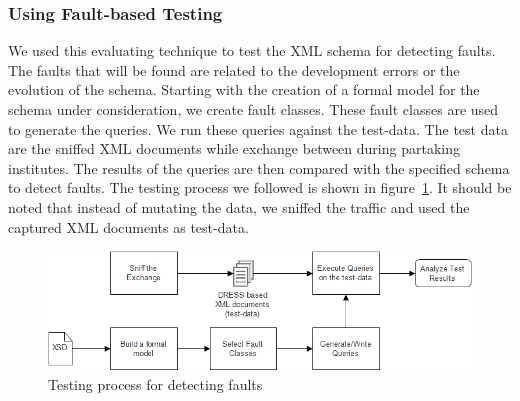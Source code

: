 \documentclass[12pt,a4paper,oneside]{book}
\begin{document}
		\subsubsection{Using Fault-based Testing}
		We used this evaluating technique to test the XML schema for detecting faults. The faults that will be found are related to the development errors or the evolution of the schema\cite{Testing XML Schemas}. Starting with the creation of a formal model for the schema under consideration, we create fault classes. These fault classes are used to generate the queries. We run these queries against the test-data. The test data are the sniffed XML documents while exchange between during partaking institutes. The results of the queries are then compared with the specified schema to detect faults. The testing process we followed is shown in figure~\ref{fig:fault-based-testing}. It should be noted that instead of mutating the data, we sniffed the traffic and used the captured XML documents as test-data.  		
		
\begin{figure}[!htp]
  \centering
  \includegraphics[width=13.5cm]{fault-based-testing.jpg}
  \caption{Testing process for detecting faults}
  \label{fig:fault-based-testing}
\end{figure}
\end{document}
